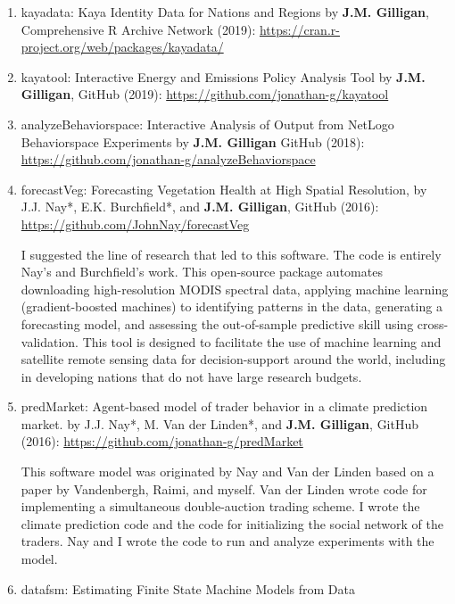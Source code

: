 %
%
\begin{enumerate}
%
\item 
kayadata: Kaya Identity Data for Nations and Regions
by \textbf{J.M. Gilligan}, 
Comprehensive R Archive Network (2019): \url{https://cran.r-project.org/web/packages/kayadata/}
%
\item 
kayatool: Interactive Energy and Emissions Policy Analysis Tool
by \textbf{J.M. Gilligan}, 
GitHub (2019): \url{https://github.com/jonathan-g/kayatool}
%
\item 
analyzeBehaviorspace: Interactive Analysis of Output from NetLogo Behaviorspace Experiments
by \textbf{J.M. Gilligan}
GitHub (2018): \url{https://github.com/jonathan-g/analyzeBehaviorspace}
%        
    \item 
    forecastVeg: Forecasting Vegetation Health  at High Spatial Resolution,
	    by J.J. Nay*, E.K. Burchfield*, and \textbf{J.M. Gilligan}, 
	    GitHub (2016): \url{https://github.com/JohnNay/forecastVeg}
\begin{credit}
I suggested the line of research that led to this software. The code is entirely Nay's and Burchfield's work. 
This open-source package automates downloading high-resolution MODIS spectral data, applying machine learning (gradient-boosted machines) to 
identifying patterns in the data, generating a forecasting model, and assessing the out-of-sample predictive skill using cross-validation. 
This tool is designed to facilitate the use of machine learning and satellite remote sensing data for decision-support
around the world, including in developing nations that do not have large research budgets.
\end{credit}
%
\item predMarket: Agent-based model of trader behavior in a climate prediction market.
by J.J. Nay*, M. Van der Linden*, and \textbf{J.M. Gilligan},
GitHub (2016): \url{https://github.com/jonathan-g/predMarket}
\begin{credit}
    This software model was originated by Nay and Van der Linden based on a paper by Vandenbergh, Raimi, 
    and myself.
    Van der Linden wrote code for implementing a simultaneous double-auction trading scheme.
    I wrote the climate prediction code and the code for initializing the social network of the traders.
    Nay and I wrote the code to run and analyze experiments with the model.
\end{credit}
%
\item 
datafsm: Estimating Finite State Machine Models from Data

\end{enumerate}

